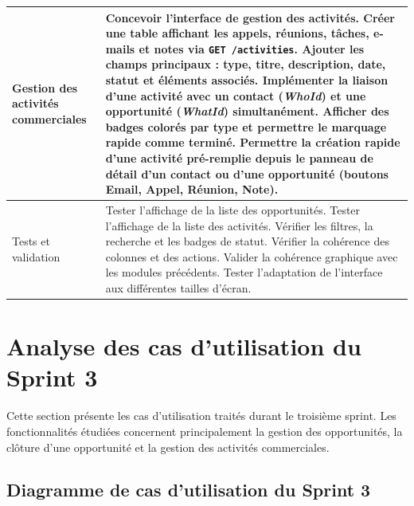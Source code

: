 \documentclass[12pt,a4paper,twoside,openany]{book}
\begin{document}
\begin{table}[h]
{\begin{tabular}{|p{4cm}|p{10.5cm}|}
Gestion des activités commerciales
&
Concevoir l’interface de gestion des activités. \newline
Créer une table affichant les appels, réunions, tâches, e-mails et notes via \texttt{GET /activities}. \newline
Ajouter les champs principaux : type, titre, description, date, statut et éléments associés. \newline
Implémenter la liaison d’une activité avec un contact (\textit{WhoId}) et une opportunité (\textit{WhatId}) simultanément. \newline
Afficher des badges colorés par type et permettre le marquage rapide comme terminé. \newline
Permettre la création rapide d’une activité pré-remplie depuis le panneau de détail d’un contact ou d’une opportunité (boutons Email, Appel, Réunion, Note). \\
\hline

Tests et validation
&
Tester l’affichage de la liste des opportunités. \newline
Tester l’affichage de la liste des activités. \newline
Vérifier les filtres, la recherche et les badges de statut. \newline
Vérifier la cohérence des colonnes et des actions. \newline
Valider la cohérence graphique avec les modules précédents. \newline
Tester l’adaptation de l’interface aux différentes tailles d’écran. \\
\hline

\end{tabular}
}
\end{table}

\section{Analyse des cas d’utilisation du Sprint 3}

Cette section présente les cas d’utilisation traités durant le troisième sprint. Les fonctionnalités étudiées concernent principalement la gestion des opportunités, la clôture d’une opportunité et la gestion des activités commerciales.

\subsection{Diagramme de cas d’utilisation du Sprint 3}
\end{document}
